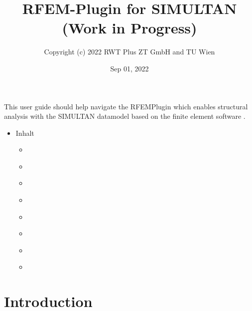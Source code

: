 \documentclass[letterpaper,10pt,english]{jupyterBook}
\title{RFEM-Plugin for SIMULTAN (Work in Progress)}
\date{Sep 01, 2022}
\author{Copyright (c) 2022 RWT Plus ZT GmbH and TU Wien}
\begin{document}
\pagestyle{empty}
\sphinxmaketitle
\pagestyle{plain}
\sphinxtableofcontents
\pagestyle{normal}
\label{\detokenize{intro::doc}}


\sphinxAtStartPar
This user guide should help navigate the RFEM\sphinxhyphen{}Plugin which enables structural analysis with the SIMULTAN datamodel based
on the finite element
software .
\begin{itemize}
\item {} 
\sphinxAtStartPar
Inhalt

\begin{itemize}
\item {} 
\sphinxAtStartPar
{\hyperref[\detokenize{Introduction::doc}]{}}

\item {} 
\sphinxAtStartPar
{\hyperref[\detokenize{Getting_started_with_the_RFem_Plugin::doc}]{}}

\item {} 
\sphinxAtStartPar
{\hyperref[\detokenize{Setting_up_a_problem::doc}]{}}

\item {} 
\sphinxAtStartPar
{\hyperref[\detokenize{Running_a_simulation::doc}]{}}

\item {} 
\sphinxAtStartPar
{\hyperref[\detokenize{Results_of_the_simulation::doc}]{}}

\item {} 
\sphinxAtStartPar
{\hyperref[\detokenize{SIMULTAN_Datastructure_to_incorporate_the_RFem_Data_model::doc}]{}}

\item {} 
\sphinxAtStartPar
{\hyperref[\detokenize{LICENSE::doc}]{}}

\item {} 
\sphinxAtStartPar
{\hyperref[\detokenize{References::doc}]{}}

\end{itemize}
\end{itemize}

\sphinxstepscope


\chapter{Introduction}
\label{\detokenize{Introduction:introduction}}\label{\detokenize{Introduction:id1}}\label{\detokenize{Introduction::doc}}
\end{document}
